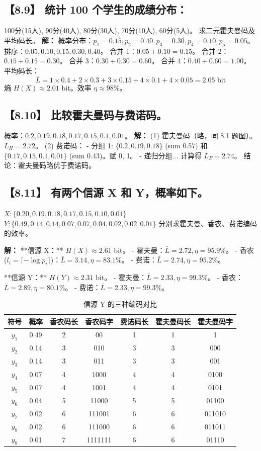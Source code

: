 \documentclass[11pt, a4paper]{article}
\begin{document}
\subsection*{【8.9】 统计 100 个学生的成绩分布：}
100分(15人), 90分(40人), 80分(30人), 70分(10人), 60分(5人)。
求二元霍夫曼码及平均码长。
\textbf{解：}
概率分布：$p_1=0.15, p_2=0.40, p_3=0.30, p_4=0.10, p_5=0.05$。
排序：$0.05, 0.10, 0.15, 0.30, 0.40$。
合并 1：$0.05+0.10=0.15$。
合并 2：$0.15+0.15=0.30$。
合并 3：$0.30+0.30=0.60$。
合并 4：$0.40+0.60=1.00$。
平均码长：
\[ \bar{L} = 1 \times 0.4 + 2 \times 0.3 + 3 \times 0.15 + 4 \times 0.1 + 4 \times 0.05 = 2.05 \text{ bit} \]
熵 $H(X) \approx 2.01$ bit。效率 $\eta \approx 98\%$。

\subsection*{【8.10】 比较霍夫曼码与费诺码。}
概率：$0.2, 0.19, 0.18, 0.17, 0.15, 0.1, 0.01$。
\textbf{解：}
(1) 霍夫曼码（略，同 8.1 题图）。$\bar{L}_H = 2.72$。
(2) 费诺码：
- 分组 1: $\{0.2, 0.19, 0.18\}$ (sum 0.57) 和 $\{0.17, 0.15, 0.1, 0.01\}$ (sum 0.43)。赋 0, 1。
- 递归分组...
计算得 $\bar{L}_F = 2.74$。
结论：霍夫曼码略优于费诺码。

\subsection*{【8.11】 有两个信源 X 和 Y，概率如下。}
$X: \{0.20, 0.19, 0.18, 0.17, 0.15, 0.10, 0.01\}$
$Y: \{0.49, 0.14, 0.14, 0.07, 0.07, 0.04, 0.02, 0.02, 0.01\}$
分别求霍夫曼、香农、费诺编码的效率。

\textbf{解：}
**信源 X：**
$H(X) \approx 2.61$ bit。
- 霍夫曼：$\bar{L}=2.72, \eta=95.9\%$。
- 香农 ($l_i = \lceil -\log p_i \rceil$)：$\bar{L}=3.14, \eta=83.1\%$。
- 费诺：$\bar{L}=2.74, \eta=95.2\%$。

**信源 Y：**
$H(Y) \approx 2.31$ bit。
- 霍夫曼：$\bar{L}=2.33, \eta=99.3\%$。
- 香农：$\bar{L}=2.89, \eta=80.1\%$。
- 费诺：$\bar{L}=2.33, \eta=99.3\%$。

\begin{table}[h]
\centering
\caption{信源 Y 的三种编码对比}
\small
\begin{tabular}{c|c|c|c|c|c|c}
\toprule
符号 & 概率 & 香农码长 & 香农码字 & 费诺码长 & 霍夫曼码长 & 霍夫曼码字 \\
\midrule
$y_1$ & 0.49 & 2 & 00 & 1 & 1 & 1 \\
$y_2$ & 0.14 & 3 & 010 & 3 & 3 & 000 \\
$y_3$ & 0.14 & 3 & 011 & 3 & 3 & 001 \\
$y_4$ & 0.07 & 4 & 1000 & 4 & 4 & 0100 \\
$y_5$ & 0.07 & 4 & 1001 & 4 & 4 & 0101 \\
$y_6$ & 0.04 & 5 & 11000 & 5 & 5 & 01100 \\
$y_7$ & 0.02 & 6 & 111001 & 6 & 6 & 011010 \\
$y_8$ & 0.02 & 6 & 111000 & 6 & 6 & 011011 \\
$y_9$ & 0.01 & 7 & 1111111 & 6 & 6 & 01110 \\
\bottomrule
\end{tabular}
\end{table}
\end{document}
